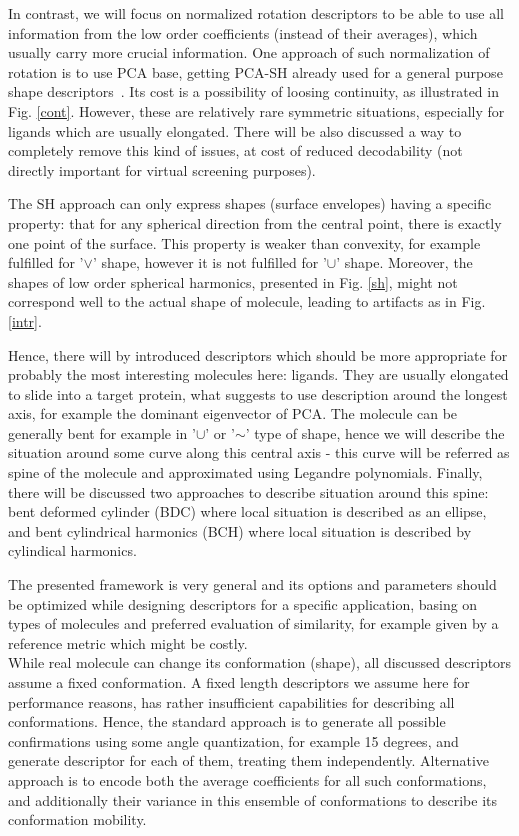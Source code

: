 \documentclass[10pt,journal]{IEEEtranTCOM}
\theoremstyle{plain}
\begin{document}
In contrast, we will focus on normalized rotation descriptors to be able to use all information from the low order coefficients (instead of their averages), which usually carry more crucial information. One approach of such normalization of rotation is to use PCA base, getting PCA-SH already used for a general purpose shape descriptors~\cite{PCAharm}. Its cost is a possibility of loosing continuity, as illustrated in Fig. \ref{cont}. However, these are relatively rare symmetric situations, especially for ligands which are usually elongated. There will be also discussed a way to completely remove this kind of issues, at cost of reduced decodability (not directly important for virtual screening purposes).

The SH approach can only express shapes (surface envelopes) having a specific property: that for any spherical direction from the central point, there is exactly one point of the surface. This property is weaker than convexity, for example fulfilled for '$\vee$' shape, however it is not fulfilled for '$\cup$' shape. Moreover, the shapes of low order spherical harmonics, presented in Fig. \ref{sh}, might not correspond well to the actual shape of molecule, leading to artifacts as in Fig. \ref{intr}.

Hence, there will by introduced descriptors which should be more appropriate for probably the most interesting molecules here: ligands. They are usually elongated to slide into a target protein, what suggests to use description around the longest axis, for example the dominant eigenvector of PCA. The molecule can be generally bent for example in '$\cup$' or '$\sim$' type of shape, hence we will describe the situation around some curve along this central axis - this curve will be referred as spine of the molecule and approximated using Legandre polynomials. Finally, there will be discussed two approaches to describe situation around this spine: bent deformed cylinder (BDC) where local situation is described as an ellipse, and bent cylindrical harmonics (BCH) where local situation is described by cylindical harmonics.

The presented framework is very general and its options and parameters should be optimized while designing descriptors for a specific application, basing on types of molecules and preferred evaluation of similarity, for example given by a reference metric which might be costly.\\

While real molecule can change its conformation (shape), all discussed descriptors assume a fixed conformation. A fixed length descriptors we assume here for performance reasons, has rather insufficient capabilities for describing all conformations. Hence, the standard approach is to generate all possible confirmations using some angle quantization, for example 15 degrees, and generate descriptor for each of them, treating them independently. Alternative approach is to encode both the average coefficients for all such conformations, and additionally their variance in this ensemble of conformations to describe its conformation mobility.
\end{document}
